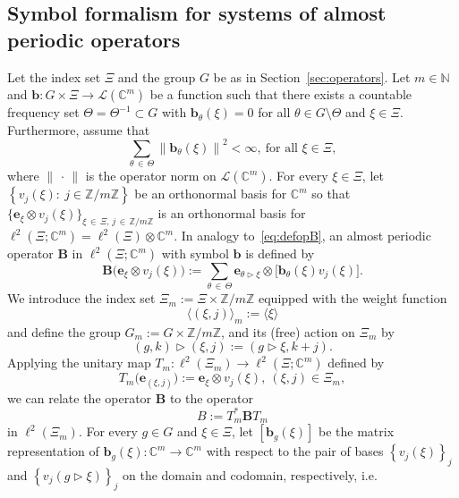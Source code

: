 \documentclass[10pt]{amsart}
\theoremstyle{definition}\newtheorem{defi}[theo]{Definition}\newtheorem{rema}[theo]{Remark}\newtheorem{exam}[theo]{Example}\newtheorem{nota}[theo]{Notation}
\newcommand{\C}{\mathbb C}
\newcommand{\N}{\mathbb N}
\newcommand{\Z}{\mathbb Z}
\newcommand{\CL}{\mathcal{L}}
\newcommand{\bb}{\mathbf b}
\newcommand{\BB}{\mathbf B}
\newcommand{\bbb}{\mathbf b}
\newcommand{\be}{\mathbf e}
\newcommand{\act}{\triangleright}
\renewcommand{\subseteq}{\subset}
\newcommand{\set}[1]{\left\{ #1 \right\}}
\newcommand{\ang}[1]{\langle #1 \rangle}
\begin{document}
\subsection{Symbol formalism for systems of almost periodic operators}
Let the index set $\Xi$ and the group $G$ be as in Section~\ref{sec:operators}. Let $m\in\N$ and $\bbb:G\times\Xi\to\CL(\C^m)$ be a function such that there exists a countable frequency set $\Theta=\Theta^{-1}\subseteq G$ with $\bbb_\theta(\xi)=0$ for all $\theta\in G\setminus \Theta$ and $\xi\in\Xi$. Furthermore, assume that
\begin{equation}
\sum\limits_{\theta\,\in\,\Theta}\left\|\bbb_\theta(\xi)\right\|^2 <\infty,\ \text{for all } \xi\in\Xi,
\end{equation}
where $\|\,\cdot\,\|$ is the operator norm on $\CL(\C^m)$. For every $\xi\in\Xi$, let $\set{v_j(\xi):\ j\in \Z/m\Z}$ be an orthonormal basis for $\C^m$ so that $\lbrace\be_\xi\otimes v_j(\xi)\rbrace_{\xi\,\in\,\Xi,\,j\,\in\,\Z/m\Z}$ is an orthonormal basis for $\ell^2(\Xi;\C^m)=\ell^2(\Xi)\otimes\C^m$. In analogy to~\eqref{eq:defopB}, an almost periodic operator $\BB$ in $\ell^2(\Xi;\C^m)$ with symbol $\bb$ is defined by
\begin{equation}\label{eq:Basmatrixop}
\BB\big(\be_\xi \otimes v_j(\xi)\big):=\sum_{\theta\,\in\,\Theta}\be_{\theta\act\xi} \otimes \big[\bbb_{\theta}(\xi)v_j(\xi)\big].
\end{equation}
We introduce the index set $\Xi_m := \Xi \times \Z/m\Z$ equipped with the weight function
\begin{equation}\label{eq:angxim}
\ang{(\xi,j)}_m:= \ang \xi
\end{equation}
and define the group $G_m:= G \times \Z/m\Z$, and its (free) action on $\Xi_m$ by
\begin{equation}\label{eq:actiongprime}
(g,k)\act(\xi,j):= (g\act \xi,k+j).
\end{equation}
Applying the unitary map $T_m:\ell^2(\Xi_m)\to\ell^2(\Xi;\C^m)$ defined by
\begin{equation}\label{eq:defTm}
T_m\big(\be_{(\xi,j)}\big):= \be_\xi\otimes v_j(\xi),\ (\xi,j)\in \Xi_m,
\end{equation}
we can relate the operator $\BB$ to the operator
\begin{equation}\label{eq:defBfromBB}
B:=T_m^\ast \BB T_m
\end{equation}
in $\ell^2(\Xi_m)$. For every $g\in G$ and $\xi\in\Xi$, let $[\bbb_g(\xi)]$ be the matrix representation of $\bbb_g(\xi):\C^m\to\C^m$ with respect to the pair of bases $\set{v_j(\xi)}_j$ and $\set{v_j(g\act \xi)}_j$ on the domain and codomain, respectively, i.e.
\end{document}

